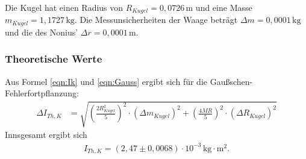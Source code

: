 Die Kugel hat einen Radius von $R_{Kugel} = 0{,}0726\,\mathrm{m} $ und eine Masse $m_{Kugel} = 1{,}1727 \,\mathrm{kg} $.
Die Messunsicherheiten der Waage beträgt $\Delta m = 0,0001\, \mathrm{kg}$ und die des Nonius' $\Delta r = 0,0001\, \mathrm{m}$.

\label{sec:TraegheitsmomentderKugel}

\subsubsection{Theoretische Werte}

Aus Formel \ref{eqn:Ik} und \ref{eqn:Gauss} ergibt sich für die Gaußschen-Fehlerfortpflanzung:
\begin{align}
  \label{eqn:K_Gauss}
  \Delta I_{Th, K} &= \sqrt{\left(\frac{2 R_{Kugel}^2}{5} \right)^2 \cdot (\Delta m_{Kugel})^2 + \left(\frac{4MR}{5} \right)^2 \cdot (\Delta R_{Kugel})^2} \nonumber
\end{align}
Innsgesamt ergibt sich
\begin{align*}
  I_{Th, K} = \left(2{,}47 \pm 0{,}0068 \right) \cdot 10^{-3} \, \mathrm{kg}\cdot\mathrm{m^2}.
\end{align*}

